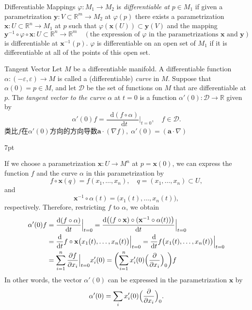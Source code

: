 \documentclass[
	border={25mm 20mm 25mm 30mm},  %
	varwidth,  %
]{standalone}
\newcommand\dd{\mathop{}\!\mathrm{d}}%
\newenvironment{greenformal}{%
\def\FrameCommand{%
\hspace{1pt}%
{\color{greenframeshade}\vrule width 2pt}%
{\color{greenformalshade}\vrule width 4pt}%
\colorbox{greenformalshade}%
}%
\MakeFramed{\advance\hsize-\width\FrameRestore}%
\noindent\hspace{-4.55pt}%
\begin{adjustwidth}{}{7pt}%
\vspace{1pt}\vspace{1pt}%
}
{%
\vspace{5pt}\end{adjustwidth}\endMakeFramed%
}
\begin{document}
\begin{tips}{Differentiable Mappings}
    \(\varphi:M_1\to M_2\) is \textsl{differentiable at} \(p\in M_1\) if given a parametrization \(\mathbf{y}:V\subset\mathbb{R}^m\to M_2\) at \(\varphi(p)\) there exists a parametrization \(\mathbf{x}:U\subset\mathbb{R}^n\to M_1\) at \(p\) such that \(\varphi(\mathbf{x}(U))\subset\mathbf{y}(V)\) and the mapping \[\mathbf{y}^{-1}\circ\varphi\circ\mathbf{x}:U\subset\mathbb{R}^n\to\mathbb{R}^m\quad(\text{the expression of }\varphi\text{ in the parametrizations }\mathbf{x}\text{ and }\mathbf{y})\] is differentiable at \(\mathbf{x}^{-1}(p)\). \(\varphi\) is differentiable on an open set of \(M_1\) if it is differentiable at all of the points of this open set.
\end{tips}

\begin{tips}{Tangent Vector}
    Let \(M\) be a differentiable manifold. A differentiable function \(\alpha:(-\varepsilon,\varepsilon)\to M\) is called a (differentiable) \textsl{curve} in \(M\). Suppose that \(\alpha(0)=p\in M\), and let \(\mathcal{D}\) be the set of functions on \(M\) that are differentiable at \(p\). The \textsl{tangent vector to the curve} \(\alpha\) at \(t=0\) is a function \(\alpha'(0):\mathcal{D}\to\mathbb{R}\) given by \[
        \alpha'(0)f=\frac{\dd (f\circ\alpha)}{\dd t}\Big|_{t=0},\quad f\in\mathcal{D}.\]
    类比\(f\)在\(\alpha'(0)\)方向的方向导数\(\bm{a}\cdot(\nabla f),\;\alpha'(0)=(\bm{a}\cdot\nabla)\)

\end{tips}

\begin{greenformal}
    If we choose a parametrization \(\mathbf{x}:U\to M^n\) at \(p=\mathbf{x}(0)\), we can express the function \(f\) and the curve \(\alpha\) in this parametrization by \[
        f\circ\mathbf{x}(q)=f(x_1,\dots,x_n),\quad q=(x_1,\dots,x_n)\subset U,\]and
    \[\mathbf{x}^{-1}\circ\alpha(t)=\bigl(x_1(t),\dots,x_n(t)\bigr),\]
    respectively. Therefore, restricting \(f\) to \(\alpha\), we obtain
    \begin{align*}
        \alpha'(0)f & =\frac{\dd (f\circ\alpha)}{\dd t}\Big|_{t=0}
        =\frac{\dd \bigl((f\circ\mathbf{x})\circ(\mathbf{x}^{-1}\circ\alpha(t))\bigr)}{\dd t}\Big|_{t=0}
        \\&=\frac{\dd}{\dd t}f\circ\mathbf{x}\bigl(x_1(t),\dots,x_n(t)\bigr)\Big|_{t=0}
        =\frac{\dd}{\dd t}f\bigl(x_1(t),\dots,x_n(t)\bigr)\Big|_{t=0}
        \\&=\sum_{i=1}^n{\frac{\partial f}{\partial x_i}\Big|_{t=0}x_i'(0)}=\biggl(\sum_{i=1}^n{x_i'(0)\Bigl(\frac{\partial}{\partial x_i}\Bigr)_0}\biggr)f
    \end{align*}
    In other words, the vector \(\alpha'(0)\) can be expressed in the parametrization \(\mathbf{x}\) by
    \[\alpha'(0)=\sum_i{x_i'(0)\Bigl(\frac{\partial}{\partial x_i}\Bigr)_0}.\]
\end{greenformal}
\end{document}
